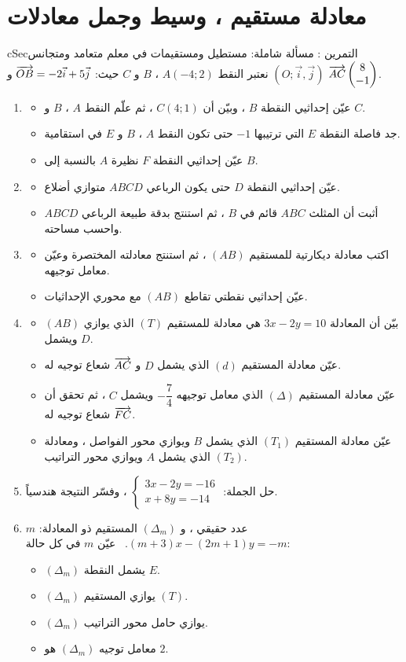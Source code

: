 \documentclass[12pt,a4paper]{article}
\newenvironment{BOX}[2]{\begin{otherlanguage}{english}\begin{arbox}{#1}{#2}}{\end{arbox}\end{otherlanguage}}
\newcounter{exo}
\newenvironment{tamrin}[1]{\stepcounter{exo}\begin{BOX}{cSec}{التمرين \theexo: #1}}{\end{BOX}}
\newenvironment{sq}{\begin{itemize}[leftmargin=2.4em,itemsep=3pt]}{\end{itemize}}
\newcommand{\qa}{\item[(أ)]}\newcommand{\qb}{\item[(ب)]}\newcommand{\qc}{\item[(جـ)]}\newcommand{\qd}{\item[(د)]}\newcommand{\qe}{\item[(هـ)]}
\begin{document}
\section{معادلة مستقيم ، وسيط وجمل معادلات}
\begin{tamrin}{مسألة شاملة: مستطيل ومستقيمات}
في معلم متعامد ومتجانس $(O;\vec i,\vec j)$ نعتبر النقط $A(-4;2)$ ، $B$ و $C$ حيث: $\overrightarrow{OB}=-2\vec i+5\vec j$ و $\overrightarrow{AC}\begin{pmatrix}8\\-1\end{pmatrix}$.
\begin{enumerate}
\item
\begin{sq}
\qa عيّن إحداثيي النقطة $B$ ، وبيّن أن $C(4;1)$ ، ثم علّم النقط $A$ ، $B$ و $C$.
\qb جد فاصلة النقطة $E$ التي ترتيبها $-1$ حتى تكون النقط $A$ ، $B$ و $E$ في استقامية.
\qc عيّن إحداثيي النقطة $F$ نظيرة $A$ بالنسبة إلى $B$.
\end{sq}
\item
\begin{sq}
\qa عيّن إحداثيي النقطة $D$ حتى يكون الرباعي $ABCD$ متوازي أضلاع.
\qb أثبت أن المثلث $ABC$ قائم في $B$ ، ثم استنتج بدقة طبيعة الرباعي $ABCD$ واحسب مساحته.
\end{sq}
\item
\begin{sq}
\qa اكتب معادلة ديكارتية للمستقيم $(AB)$ ، ثم استنتج معادلته المختصرة وعيّن معامل توجيهه.
\qb عيّن إحداثيي نقطتي تقاطع $(AB)$ مع محوري الإحداثيات.
\end{sq}
\item
\begin{sq}
\qa بيّن أن المعادلة $3x-2y=10$ هي معادلة للمستقيم $(T)$ الذي يوازي $(AB)$ ويشمل $D$.
\qb عيّن معادلة المستقيم $(d)$ الذي يشمل $D$ و $\overrightarrow{AC}$ شعاع توجيه له.
\qc عيّن معادلة المستقيم $(\Delta)$ الذي معامل توجيهه $-\dfrac74$ ويشمل $C$ ، ثم تحقق أن $\overrightarrow{FC}$ شعاع توجيه له.
\qd عيّن معادلة المستقيم $(T_1)$ الذي يشمل $B$ ويوازي محور الفواصل ، ومعادلة $(T_2)$ الذي يشمل $A$ ويوازي محور التراتيب.
\end{sq}
\item حل الجملة: $\begin{cases}3x-2y=-16\\x+8y=-14\end{cases}$ ، وفسّر النتيجة هندسياً.
\item $m$ عدد حقيقي ، و $(\Delta_m)$ المستقيم ذو المعادلة: $(m+3)x-(2m+1)y=-m$. \ عيّن $m$ في كل حالة:
\begin{sq}
\qa $(\Delta_m)$ يشمل النقطة $E$.
\qb $(\Delta_m)$ يوازي المستقيم $(T)$.
\qc $(\Delta_m)$ يوازي حامل محور التراتيب.
\qd معامل توجيه $(\Delta_m)$ هو $2$.
\end{sq}
\end{enumerate}
\end{tamrin}
\end{document}
